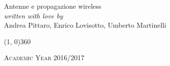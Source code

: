 \documentclass[a4paper, 12pt, twoside, openright, fleqn]{book}
\theoremstyle{theoremdd}
\theoremstyle{remark}
\begin{document}
\begin{titlepage}
	\begin{center}
		\hspace{0.5cm}
		\Large{Antenne e propagazione wireless} \\
		\vspace{1cm}
		\vspace{0.5cm}
		\emph{written with love by} \\
		\vspace{0.5cm}
		{\Large Andrea Pittaro, Enrico Lovisotto, Umberto Martinelli}
	\end{center}

	\vfill

	\begin{center}
		\line(1, 0){360}

		\textsc{Academic Year 2016/2017}
	\end{center}
\end{titlepage}

\tableofcontents
\clearpage





\end{document}
